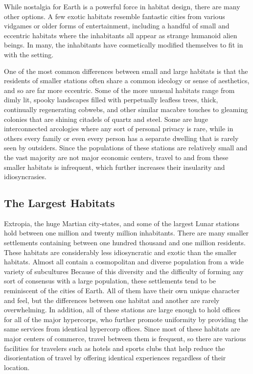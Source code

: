 While nostalgia for Earth is a powerful force in 
habitat design, there are many other options. A few 
exotic habitats resemble fantastic cities from various 
vidgames or older forms of entertainment, including a 
handful of small and eccentric habitats where the inhabitants
all appear as strange humanoid alien beings.
In many, the inhabitants have cosmetically modified 
themselves to fit in with the setting.

One of the most common differences between small 
and large habitats is that the residents of smaller 
stations often share a common ideology or sense of 
aesthetics, and so are far more eccentric. Some of the 
more unusual habitats range from dimly lit, spooky 
landscapes filled with perpetually leafless trees, thick, 
continually regenerating cobwebs, and other similar 
macabre touches to gleaming colonies that are shining 
citadels of quartz and steel. Some are huge interconnected
arcologies where any sort of personal privacy
is rare, while in others every family or even every 
person has a separate dwelling that is rarely seen by 
outsiders. Since the populations of these stations are 
relatively small and the vast majority are not major 
economic centers, travel to and from these smaller 
habitats is infrequent, which further increases their 
insularity and idiosyncrasies.

\subsection{The Largest Habitats}

Extropia, the huge Martian city-states, and some 
of the largest Lunar stations hold between one million
and twenty million inhabitants. There are many
smaller settlements containing between one hundred 
thousand and one million residents. These habitats 
are considerably less idiosyncratic and exotic than the 
smaller habitats. Almost all contain a cosmopolitan 
and diverse population from a wide variety of subcultures
Because of this diversity and the difficulty of
forming any sort of consensus with a large population, 
these settlements tend to be reminiscent of the cities 
of Earth. All of them have their own unique character 
and feel, but the differences between one habitat and 
another are rarely overwhelming. In addition, all of 
these stations are large enough to hold offices for all 
of the major hypercorps, who further promote uniformity
by providing the same services from identical
hypercorp offices. Since most of these habitats are 
major centers of commerce, travel between them is 
frequent, so there are various facilities for travelers 
such as hotels and sports clubs that help reduce the 
disorientation of travel by offering identical experiences
regardless of their location.

